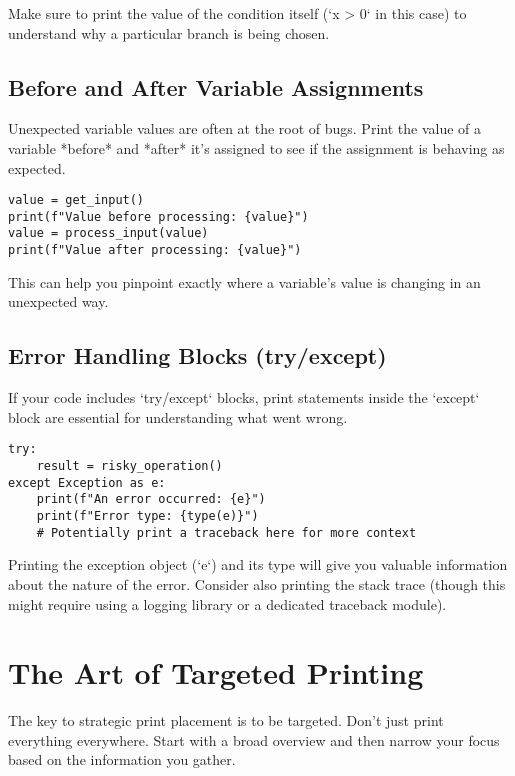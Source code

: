 \documentclass{article}
\begin{document}
Make sure to print the value of the condition itself (`x > 0` in this case) to understand why a particular branch is being chosen.

\subsection*{Before and After Variable Assignments}

Unexpected variable values are often at the root of bugs. Print the value of a variable *before* and *after* it's assigned to see if the assignment is behaving as expected.

\begin{verbatim}
value = get_input()
print(f"Value before processing: {value}")
value = process_input(value)
print(f"Value after processing: {value}")
\end{verbatim}

This can help you pinpoint exactly where a variable's value is changing in an unexpected way.

\subsection*{Error Handling Blocks (try/except)}

If your code includes `try/except` blocks, print statements inside the `except` block are essential for understanding what went wrong.

\begin{verbatim}
try:
    result = risky_operation()
except Exception as e:
    print(f"An error occurred: {e}")
    print(f"Error type: {type(e)}")
    # Potentially print a traceback here for more context
\end{verbatim}

Printing the exception object (`e`) and its type will give you valuable information about the nature of the error.  Consider also printing the stack trace (though this might require using a logging library or a dedicated traceback module).

\section*{The Art of Targeted Printing}

The key to strategic print placement is to be targeted. Don't just print everything everywhere.  Start with a broad overview and then narrow your focus based on the information you gather.
\end{document}
